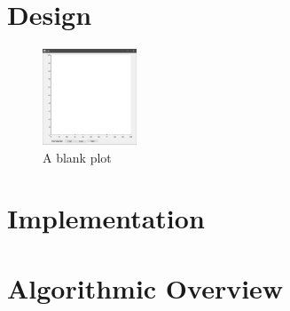 \documentclass[10pt, a4paper]{article}
\title{\mytitle}
\author{\myauthor\hspace{1em}\\\contact\\Cardiff University\hspace{0.5em}-\hspace{0.5em}\mymodule}
\date{}
\begin{document}
\maketitle
\tableofcontents
\section{Design}
\begin{figure}[h]
    \centering
    \includegraphics[width=0.25\textwidth]{empty}
    \caption{A blank plot}
    \label{fig:empty}
\end{figure}
\section{Implementation}
\section{Algorithmic Overview}





















\end{document}
